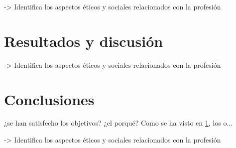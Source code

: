 \documentclass{article}
\begin{document}
->  Identifica los aspectos éticos y sociales relacionados con la profesión

\section{Resultados y discusión}\label{sec:ResultadosDisc}

-> Identifica los aspectos éticos y sociales relacionados con la profesión


\section{Conclusiones}\label{sec:Conclusiones}

 ¿se han satisfecho los objetivos? ¿el porqué? Como se ha visto en \ref{sec:ResultadosDisc}, los o...

-> Identifica los aspectos éticos y sociales relacionados con la profesión




\end{document}
